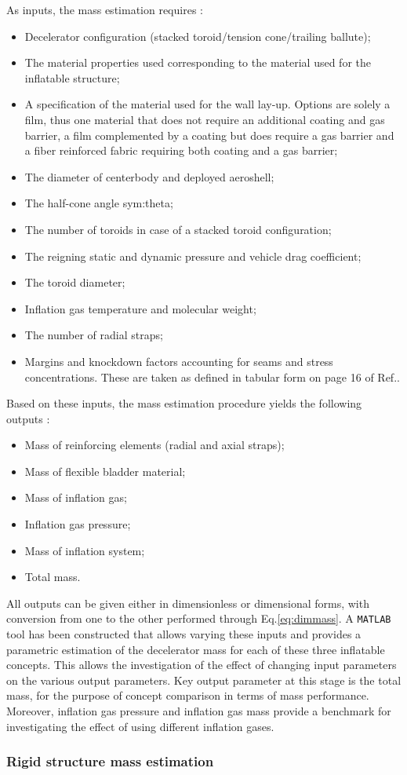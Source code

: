 As inputs, the mass estimation requires \cite{Samareh2011}:
\begin{itemize}
\item Decelerator configuration (stacked toroid/tension cone/trailing ballute);
\item The material properties used corresponding to the material used for the inflatable structure; 
\item A specification of the material used for the wall lay-up. Options are solely a film, thus one material that does not require an additional coating and gas barrier, a film complemented by a coating but does require a gas barrier and a fiber reinforced fabric requiring both coating and a gas barrier;
\item The diameter of centerbody and deployed aeroshell;
\item The half-cone angle \gls{sym:theta};
\item The number of toroids in case of a stacked toroid configuration;
\item The reigning static and dynamic pressure and vehicle drag coefficient;
\item The toroid diameter;
\item Inflation gas temperature and molecular weight;
\item The number of radial straps;
\item Margins and knockdown factors accounting for seams and stress concentrations. These are taken as defined in tabular form on page 16 of Ref.\cite{Samareh2011}.
\end{itemize}

Based on these inputs, the mass estimation procedure yields the following outputs \cite{Samareh2011}:
\begin{itemize}
\item Mass of reinforcing elements (radial and axial straps);
\item Mass of flexible bladder material;
\item Mass of inflation gas;
\item Inflation gas pressure;
\item Mass of inflation system;
\item Total mass.
\end{itemize}
All outputs can be given either in dimensionless or dimensional forms, with conversion from one to the other performed through Eq.\ref{eq:dimmass}. A \texttt{MATLAB} tool has been constructed that allows varying these inputs and provides a parametric estimation of the decelerator mass for each of these three inflatable concepts. This allows the investigation of the effect of changing input parameters on the various output parameters. Key output parameter at this stage is the total mass, for the purpose of concept comparison in terms of mass performance. Moreover, inflation gas pressure and inflation gas mass provide a benchmark for investigating the effect of using different inflation gases.




\subsubsection{Rigid structure mass estimation}

